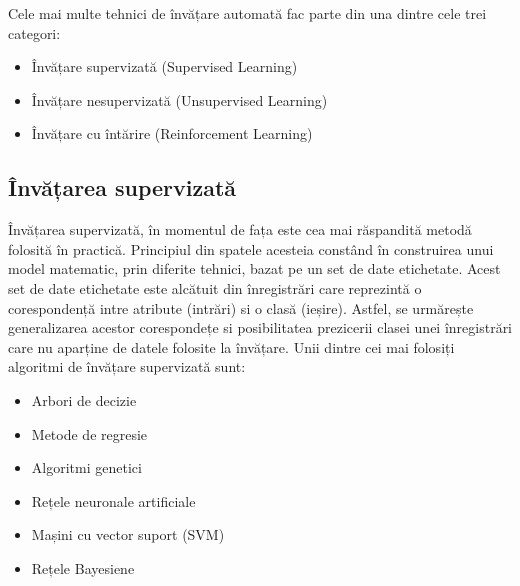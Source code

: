 Cele mai multe tehnici de învățare automată fac parte din una dintre cele trei categori:
\begin{itemize}
	\item Învățare supervizată (Supervised Learning)
	\item Învățare nesupervizată (Unsupervised Learning)
	\item Învățare cu întărire (Reinforcement Learning)
\end{itemize}

\subsection*{Învățarea supervizată}
Învățarea supervizată, în momentul de fața este cea mai răspandită metodă folosită în practică. Principiul din spatele acesteia constând în construirea unui model matematic, prin diferite tehnici, bazat pe un set de date etichetate. Acest set de date etichetate este alcătuit din înregistrări care reprezintă o corespondență intre atribute (intrări) si o clasă (ieșire). Astfel, se urmărește generalizarea acestor corespondețe si posibilitatea prezicerii clasei unei înregistrări care nu aparține de datele folosite la învățare. Unii dintre cei mai folosiți algoritmi de învățare supervizată sunt:
\begin{itemize}
	\item Arbori de decizie
	\item Metode de regresie
	\item Algoritmi genetici
	\item Rețele neuronale artificiale
	\item Mașini cu vector suport (SVM)
	\item Rețele Bayesiene
\end{itemize}

